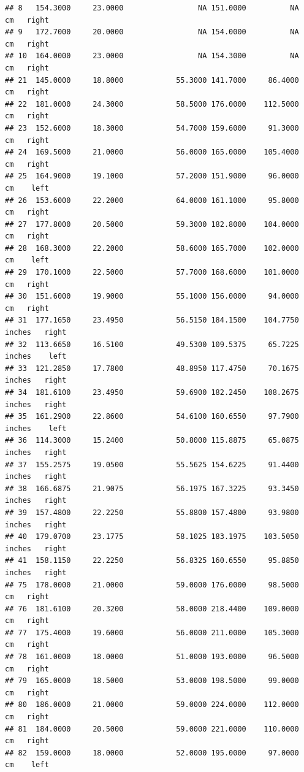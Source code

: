 \documentclass[]{article}
\begin{document}
\begin{verbatim}
## 8   154.3000     23.0000                 NA 151.0000          NA     cm   right
## 9   172.7000     20.0000                 NA 154.0000          NA     cm   right
## 10  164.0000     23.0000                 NA 154.3000          NA     cm   right
## 21  145.0000     18.8000            55.3000 141.7000     86.4000     cm   right
## 22  181.0000     24.3000            58.5000 176.0000    112.5000     cm   right
## 23  152.6000     18.3000            54.7000 159.6000     91.3000     cm   right
## 24  169.5000     21.0000            56.0000 165.0000    105.4000     cm   right
## 25  164.9000     19.1000            57.2000 151.9000     96.0000     cm    left
## 26  153.6000     22.2000            64.0000 161.1000     95.8000     cm   right
## 27  177.8000     20.5000            59.3000 182.8000    104.0000     cm   right
## 28  168.3000     22.2000            58.6000 165.7000    102.0000     cm    left
## 29  170.1000     22.5000            57.7000 168.6000    101.0000     cm   right
## 30  151.6000     19.9000            55.1000 156.0000     94.0000     cm   right
## 31  177.1650     23.4950            56.5150 184.1500    104.7750 inches   right
## 32  113.6650     16.5100            49.5300 109.5375     65.7225 inches    left
## 33  121.2850     17.7800            48.8950 117.4750     70.1675 inches   right
## 34  181.6100     23.4950            59.6900 182.2450    108.2675 inches   right
## 35  161.2900     22.8600            54.6100 160.6550     97.7900 inches    left
## 36  114.3000     15.2400            50.8000 115.8875     65.0875 inches   right
## 37  155.2575     19.0500            55.5625 154.6225     91.4400 inches   right
## 38  166.6875     21.9075            56.1975 167.3225     93.3450 inches   right
## 39  157.4800     22.2250            55.8800 157.4800     93.9800 inches   right
## 40  179.0700     23.1775            58.1025 183.1975    103.5050 inches   right
## 41  158.1150     22.2250            56.8325 160.6550     95.8850 inches   right
## 75  178.0000     21.0000            59.0000 176.0000     98.5000     cm   right
## 76  181.6100     20.3200            58.0000 218.4400    109.0000     cm   right
## 77  175.4000     19.6000            56.0000 211.0000    105.3000     cm   right
## 78  161.0000     18.0000            51.0000 193.0000     96.5000     cm   right
## 79  165.0000     18.5000            53.0000 198.5000     99.0000     cm   right
## 80  186.0000     21.0000            59.0000 224.0000    112.0000     cm   right
## 81  184.0000     20.5000            59.0000 221.0000    110.0000     cm   right
## 82  159.0000     18.0000            52.0000 195.0000     97.0000     cm    left

\end{verbatim}
\end{document}
